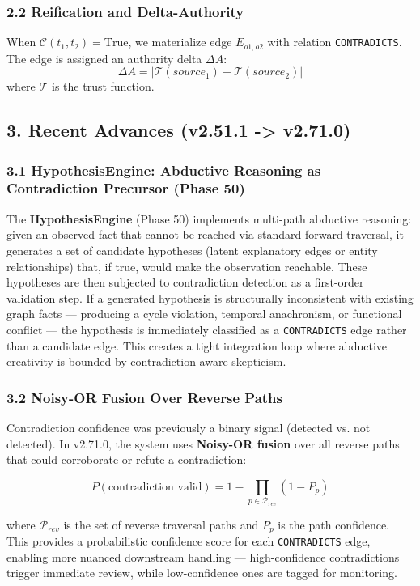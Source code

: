 \subsubsection*{2.2 Reification and Delta-Authority}
When $\mathcal{C}(t_1, t_2) = \text{True}$, we materialize edge $E_{o1,o2}$ with relation \texttt{CONTRADICTS}. The edge is assigned an authority delta $\Delta A$:
$$\Delta A = | \mathcal{T}(source_1) - \mathcal{T}(source_2) |$$
where $\mathcal{T}$ is the trust function.

\subsection*{3. Recent Advances (v2.51.1 -> v2.71.0)}

\subsubsection*{3.1 HypothesisEngine: Abductive Reasoning as Contradiction Precursor (Phase 50)}
The \textbf{HypothesisEngine} (Phase 50) implements multi-path abductive reasoning: given an observed fact that cannot be reached via standard forward traversal, it generates a set of candidate hypotheses (latent explanatory edges or entity relationships) that, if true, would make the observation reachable. These hypotheses are then subjected to contradiction detection as a first-order validation step. If a generated hypothesis is structurally inconsistent with existing graph facts --- producing a cycle violation, temporal anachronism, or functional conflict --- the hypothesis is immediately classified as a \texttt{CONTRADICTS} edge rather than a candidate edge. This creates a tight integration loop where abductive creativity is bounded by contradiction-aware skepticism.

\subsubsection*{3.2 Noisy-OR Fusion Over Reverse Paths}
Contradiction confidence was previously a binary signal (detected vs. not detected). In v2.71.0, the system uses \textbf{Noisy-OR fusion} over all reverse paths that could corroborate or refute a contradiction:

$$P(\text{contradiction valid}) = 1 - \prod_{p \in \mathcal{P}_{rev}} (1 - P_p)$$

where $\mathcal{P}_{rev}$ is the set of reverse traversal paths and $P_p$ is the path confidence. This provides a probabilistic confidence score for each \texttt{CONTRADICTS} edge, enabling more nuanced downstream handling --- high-confidence contradictions trigger immediate review, while low-confidence ones are tagged for monitoring.


